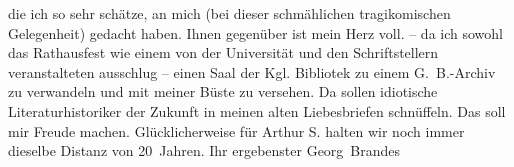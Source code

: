 \begin{ledgroupsized}[t]{13cm}
                    die ich so sehr schätze, an mich (bei dieser schmählichen tragikomischen
                    Gelegenheit) gedacht haben.\pend
           \pstart
           Ihnen gegenüber ist mein Herz voll. \label{K_L02051_1v}\label{K_L02051_1h} – da ich sowohl das Rathausfest wie einem
                    von der Universität und den Schriftstellern veranstalteten ausschlug – einen
                    Saal der Kgl. Bibliotek zu einem G. B.-Archiv zu verwandeln und mit meiner Büste
                    zu versehen.\pend
           \pstart
           Da sollen idiotische Literaturhistoriker der Zukunft in meinen alten
                    Liebesbriefen schnüffeln. Das soll mir Freude machen.\pend
           \pstart
           Glücklicherweise für Arthur S. halten wir noch immer dieselbe Distanz von
                    20 Jahren.\pend
           \pstart Ihr ergebenster \spacefill\mbox{Georg Brandes}\pend{}\endnumbering{}\end{ledgroupsized}  \newcommand{\dateiname}{L02051}\newcommand{\titel}{Georg Brandes an Arthur und Olga Schnitzler, 3. 2. 1912}\newcommand{\editorInnen}{Martin Anton Müller und Gerd-Hermann Susen}
      